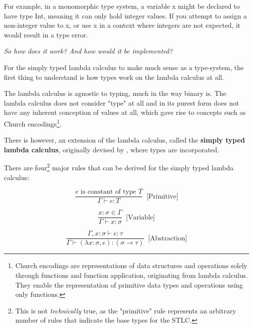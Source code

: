\documentclass{l4proj}
\begin{document}
For example, in a monomorphic type system, a variable x might be declared to have type Int, meaning it can only hold integer values.
If you attempt to assign a non-integer value to x, or use x in a context where integers are not expected, it would result in a type error.



\emph{So how does it work? And how would it be implemented?}

For the simply typed lambda calculus to make much sense as a type-system, the first thing to understand is how types work on the lambda calculus at all.

The lambda calculus is agnostic to typing, much in the way binary is.
The lambda calculus does not consider "type" at all and in its purest form does not have any inherent conception of values at all, which gave rise to concepts such as Church encodings\footnote{Church encodings are representations of data structures and operations solely through functions and function application, originating from lambda calculus. They enable the representation of primitive data types and operations using only functions.}. 

There is however, an extension of the lambda calculus, called the \textbf{simply typed lambda calculus}, originally devised by \citet{Church_1940}, where types are incorporated.

There are four\footnote{This is not \emph{technically} true, as the "primitive" rule represents an arbitrary number of rules that indicate the base types for the STLC.} major rules that can be derived for the simply typed lambda calculus\citep{Stlc_upenn}:


\begin{equation*} \label{eq:stlc-primitives-rule}
    \frac{e\text{ is constant of type }T}{\Gamma \vdash e:T} \;\;\text{[Primitive]}
\end{equation*}

\begin{equation*} \label{eq:stlc-var-rule}
    \frac{x:\sigma \in \Gamma}{\Gamma \vdash x:\sigma} \;\;\text{[Variable]}
\end{equation*}

\begin{equation*} \label{eq:stlc-abstraction}
    \frac{\Gamma, x:\sigma \vdash e:\tau}{\Gamma \vdash (\lambda x:\sigma, e): (\sigma \rightarrow \tau)} \;\;\text{[Abstraction]}
\end{equation*}
\end{document}
